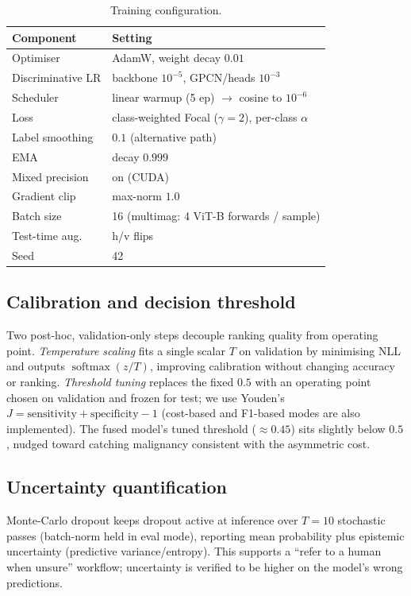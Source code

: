 \documentclass[11pt]{article}
\DeclareMathOperator*{\softmax}{softmax}
\begin{document}
\begin{table}[t]
\centering
\caption{Training configuration.}
\label{tab:train}
\small
\begin{tabular}{@{}ll@{}}
\toprule
Component & Setting \\
\midrule
Optimiser & AdamW, weight decay $0.01$ \\
Discriminative LR & backbone $10^{-5}$, GPCN/heads $10^{-3}$ \\
Scheduler & linear warmup (5 ep) $\rightarrow$ cosine to $10^{-6}$ \\
Loss & class-weighted Focal ($\gamma=2$), per-class $\alpha$ \\
Label smoothing & $0.1$ (alternative path) \\
EMA & decay $0.999$ \\
Mixed precision & on (CUDA) \\
Gradient clip & max-norm $1.0$ \\
Batch size & 16 (multimag: 4 ViT-B forwards / sample) \\
Test-time aug. & h/v flips \\
Seed & 42 \\
\bottomrule
\end{tabular}
\end{table}

\subsection{Calibration and decision threshold}
Two post-hoc, validation-only steps decouple ranking quality from operating point.
\emph{Temperature scaling} fits a single scalar $T$ on validation by minimising
NLL and outputs $\softmax(z/T)$, improving calibration without changing accuracy or
ranking. \emph{Threshold tuning} replaces the fixed $0.5$ with an operating point
chosen on validation and frozen for test; we use Youden's
$J=\text{sensitivity}+\text{specificity}-1$ (cost-based and F1-based modes are also
implemented). The fused model's tuned threshold ($\approx0.45$) sits slightly below
$0.5$, nudged toward catching malignancy consistent with the asymmetric cost.

\subsection{Uncertainty quantification}
Monte-Carlo dropout keeps dropout active at inference over $T{=}10$ stochastic
passes (batch-norm held in eval mode), reporting mean probability plus epistemic
uncertainty (predictive variance/entropy). This supports a ``refer to a human when
unsure'' workflow; uncertainty is verified to be higher on the model's wrong
predictions.
\end{document}

